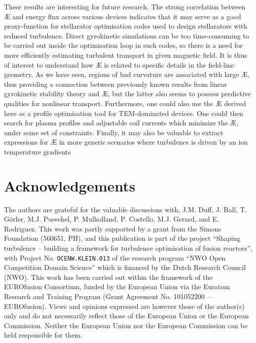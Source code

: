 These results are interesting for future research. The strong correlation between \AE{} and energy flux across various devices indicates that it may serve as a good proxy-function for stellarator optimisation codes\citep{Spong2001PhysicsStellarators,landreman2021simsopt} used to design stellarators with reduced turbulence. Direct gyrokinetic simulations can be too time-consuming to be carried out inside the optimisation loop in such codes, so there is a need for more efficiently estimating turbulent transport in given magnetic field. It is thus of interest to understand how \AE{} is related to specific details in the field-line geometry. As we have seen, regions of bad curvature are associated with large \AE{}, thus providing a connection between previously known results from linear gyrokinetic stability theory and \AE{}, but the latter also seems to possess predictive qualities for nonlinear transport. Furthermore, one could also use the \AE{} derived here as a profile optimisation tool for TEM-dominated devices. One could then search for plasma profiles and adjustable coil currents which minimize the \AE{}, under some set of constraints. Finally, it may also be valuable to extract expressions for \AE{} in more generic scenarios where turbulence is driven by an ion temperature gradients
\section*{Acknowledgements} \label{sec:acknowledgements}
The authors are grateful for the valuable discussions with, J.M. Duff, J. Ball, T. G\"orler, M.J. Pueschel, P. Mulholland, P. Costello, M.J. Gerard, and E. Rodriguez. This work was partly supported by a grant from the Simons Foundation (560651, PH), and this publication is part of the project ``Shaping turbulence – building a framework for turbulence optimisation of fusion reactors'', with Project No. \texttt{OCENW.KLEIN.013} of the research program ``NWO Open Competition Domain Science'' which is financed by the Dutch Research Council (NWO). This work has been carried out within the framework of the EUROfusion Consortium, funded by the European Union via the Euratom Research and Training Program (Grant Agreement No. 101052200 — EUROfusion). Views and opinions expressed are however those of the author(s) only and do not necessarily reflect those of the European Union or the European Commission. Neither the European Union nor the European Commission can be held responsible for them. 

\renewcommand\thesection{\Alph{section}}
\setcounter{section}{0}

